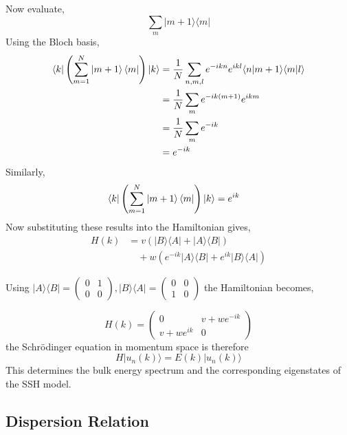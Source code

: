 \documentclass[11pt, a4paper]{article}
\begin{document}
Now evaluate,
\begin{equation*}
    \sum_{m}|m+1\rangle\langle m|
\end{equation*}
Using the Bloch basis,
\begin{align*}
\bra{k}
\left(\sum_{m=1}^{N}\ket{m+1}\bra{m}\right)
\ket{k}
&=
\frac1N
\sum_{n,m,l}
e^{-ikn}e^{ikl}
\langle n|m+1\rangle
\langle m|l\rangle
\\
&=
\frac1N
\sum_{m}
e^{-ik(m+1)}
e^{ikm}
\\
&=
\frac1N
\sum_{m}
e^{-ik}
\\
&=
e^{-ik}
\end{align*}
Similarly, 
\begin{align*}
\bra{k}
\left(\sum_{m=1}^{N}\ket{m+1}\bra{m}\right)
\ket{k}
&=
e^{ik}
\end{align*}
Now substituting these results into the Hamiltonian gives,
\begin{align*}
H(k)
&=
v
\left(
|B\rangle\langle A|
+
|A\rangle\langle B|
\right)
\\
&\quad
+
w
\left(
e^{-ik}|A\rangle\langle B|
+
e^{ik}|B\rangle\langle A|
\right)
\end{align*}

Using $|A\rangle\langle B| = \begin{pmatrix} 0&1 \\ 0&0 \end{pmatrix}, |B\rangle\langle A| = \begin{pmatrix} 0&0 \\ 1&0 \end{pmatrix}$ the Hamiltonian becomes,

\begin{equation}
    H(k)=
\begin{pmatrix}
    0& v+we^{-ik} \\
    v+we^{ik} & 0
\end{pmatrix}
\label{eq:momentum_space_Hamiltonian}
\end{equation}
the Schr\"odinger equation in momentum space is therefore
\begin{equation*}
    H|u_n(k)\rangle = E(k)|u_n(k)\rangle
\end{equation*}
This determines the bulk energy spectrum and the corresponding eigenstates of the SSH model.

\subsection{Dispersion Relation}
\end{document}
